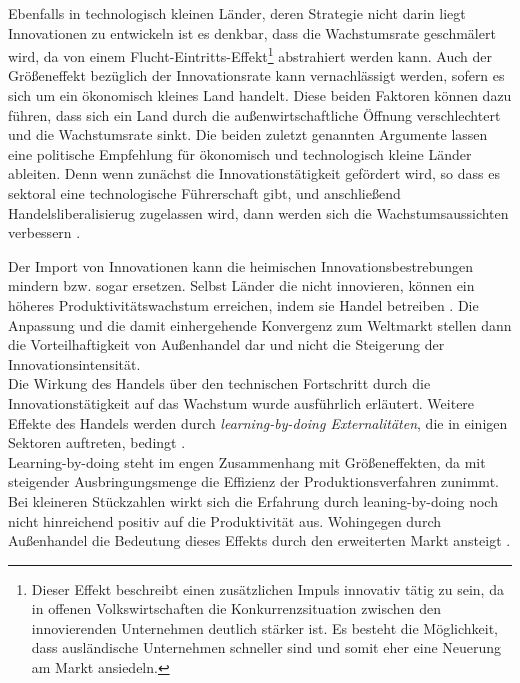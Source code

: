 Ebenfalls in technologisch kleinen Länder, deren Strategie nicht darin liegt Innovationen zu entwickeln ist es denkbar, dass die Wachstumsrate geschmälert wird, da von einem Flucht-Eintritts-Effekt\footnote{Dieser Effekt beschreibt einen zusätzlichen Impuls innovativ tätig zu sein, da in offenen Volkswirtschaften die Konkurrenzsituation zwischen den innovierenden Unternehmen deutlich stärker ist. Es besteht die Möglichkeit, dass ausländische Unternehmen schneller sind und somit eher eine Neuerung am Markt ansiedeln.} abstrahiert werden kann. Auch der Gr{\"o}{\ss}eneffekt bezüglich der Innovationsrate kann vernachl{\"a}ssigt werden, sofern es sich um ein {\"o}konomisch kleines Land handelt. Diese beiden Faktoren k{\"o}nnen dazu führen, dass sich ein Land  durch die au{\ss}enwirtschaftliche {\"O}ffnung verschlechtert und die Wachstumsrate sinkt. \newline  Die beiden zuletzt genannten Argumente lassen eine politische Empfehlung für ökonomisch und technologisch kleine Länder ableiten. Denn wenn zun{\"a}chst die Innovationst{\"a}tigkeit gef{\"o}rdert wird, so dass es sektoral eine technologische F{\"u}hrerschaft gibt, und anschlie{\ss}end Handelsliberalisierug zugelassen wird, dann werden sich die Wachstumsaussichten verbessern \citep{Aghion.2015}.


Der Import von Innovationen kann die heimischen Innovationsbestrebungen mindern bzw. sogar ersetzen. Selbst L{\"a}nder die nicht innovieren, k{\"o}nnen ein h{\"o}heres Produktivit{\"a}tswachstum erreichen, indem sie Handel betreiben \citep{Aghion.2015}. Die Anpassung und die damit einhergehende Konvergenz zum Weltmarkt stellen dann die Vorteilhaftigkeit von Au{\ss}enhandel dar und nicht die Steigerung der Innovationsintensität.\\
Die Wirkung des Handels {\"u}ber den technischen Fortschritt durch die Innovationst{\"a}tigkeit auf das Wachstum wurde ausf{\"u}hrlich erl{\"a}utert. Weitere Effekte des Handels werden  durch \textit{learning-by-doing Externalit{\"a}ten}, die in einigen Sektoren auftreten, bedingt \citep{Young.1991,Matsuyama.}.\\
Learning-by-doing steht im engen Zusammenhang mit Grö{\ss}eneffekten, da mit steigender Ausbringungsmenge die Effizienz der Produktionsverfahren zunimmt. Bei kleineren Stückzahlen wirkt sich die Erfahrung durch leaning-by-doing noch nicht hinreichend positiv auf die Produktivität aus. Wohingegen durch Au{\ss}enhandel die Bedeutung dieses Effekts durch den erweiterten Markt ansteigt \citep{Arrow.1962}.\\


